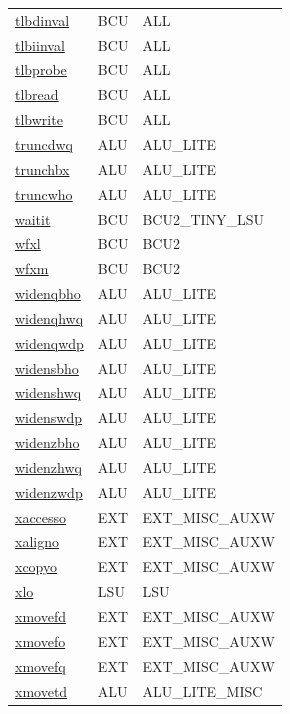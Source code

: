 \begin{small}
\begin{longtable}[l]{l l l}
\hyperlink{lvx.tlbdinval}{tlbdinval} & BCU & ALL \\ 
\hyperlink{lvx.tlbiinval}{tlbiinval} & BCU & ALL \\ 
\hyperlink{lvx.tlbprobe}{tlbprobe} & BCU & ALL \\ 
\hyperlink{lvx.tlbread}{tlbread} & BCU & ALL \\ 
\hyperlink{lvx.tlbwrite}{tlbwrite} & BCU & ALL \\ 
\hyperlink{lvx.truncdwq}{truncdwq} & ALU & ALU\_LITE \\ 
\hyperlink{lvx.trunchbx}{trunchbx} & ALU & ALU\_LITE \\ 
\hyperlink{lvx.truncwho}{truncwho} & ALU & ALU\_LITE \\ 
\hyperlink{lvx.waitit}{waitit} & BCU & BCU2\_TINY\_LSU \\ 
\hyperlink{lvx.wfxl}{wfxl} & BCU & BCU2 \\ 
\hyperlink{lvx.wfxm}{wfxm} & BCU & BCU2 \\ 
\hyperlink{lvx.widenqbho}{widenqbho} & ALU & ALU\_LITE \\ 
\hyperlink{lvx.widenqhwq}{widenqhwq} & ALU & ALU\_LITE \\ 
\hyperlink{lvx.widenqwdp}{widenqwdp} & ALU & ALU\_LITE \\ 
\hyperlink{lvx.widensbho}{widensbho} & ALU & ALU\_LITE \\ 
\hyperlink{lvx.widenshwq}{widenshwq} & ALU & ALU\_LITE \\ 
\hyperlink{lvx.widenswdp}{widenswdp} & ALU & ALU\_LITE \\ 
\hyperlink{lvx.widenzbho}{widenzbho} & ALU & ALU\_LITE \\ 
\hyperlink{lvx.widenzhwq}{widenzhwq} & ALU & ALU\_LITE \\ 
\hyperlink{lvx.widenzwdp}{widenzwdp} & ALU & ALU\_LITE \\ 
\hyperlink{lvx.xaccesso}{xaccesso} & EXT & EXT\_MISC\_AUXW \\ 
\hyperlink{lvx.xaligno}{xaligno} & EXT & EXT\_MISC\_AUXW \\ 
\hyperlink{lvx.xcopyo}{xcopyo} & EXT & EXT\_MISC\_AUXW \\ 
\hyperlink{lvx.xlo}{xlo} & LSU & LSU \\ 
\hyperlink{lvx.xmovefd}{xmovefd} & EXT & EXT\_MISC\_AUXW \\ 
\hyperlink{lvx.xmovefo}{xmovefo} & EXT & EXT\_MISC\_AUXW \\ 
\hyperlink{lvx.xmovefq}{xmovefq} & EXT & EXT\_MISC\_AUXW \\ 
\hyperlink{lvx.xmovetd}{xmovetd} & ALU & ALU\_LITE\_MISC \\ 

\end{longtable}
\end{small}
